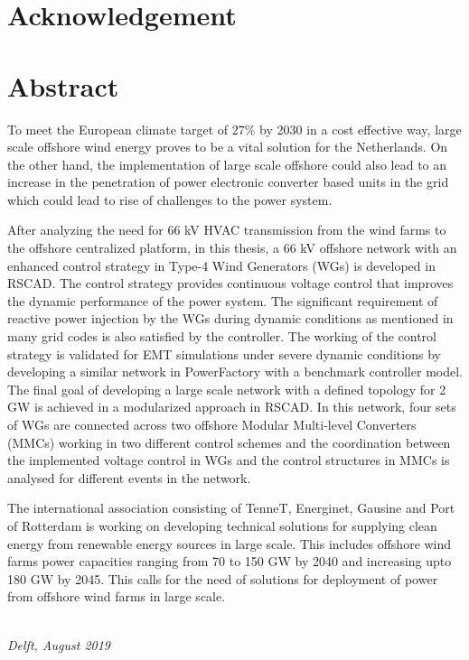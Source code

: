 
\chapter*{Acknowledgement}



\newpage
\chapter*{Abstract}
To meet the European climate target of 27\% by 2030 in a cost effective way, large scale offshore wind energy proves to be a vital solution for the Netherlands. On the other hand, the implementation of large scale offshore could also lead to an increase in the penetration of power electronic converter based units in the grid which could lead to rise of challenges to the power system.

After analyzing the need for 66 kV \gls{HVAC} transmission from the wind farms to the offshore centralized platform, in this thesis, a 66 kV offshore network with an enhanced control strategy in Type-4 Wind Generators (\gls{WG}s) is developed in RSCAD. The control strategy provides continuous voltage control that improves the dynamic performance of the power system. The significant requirement of reactive power injection by the \gls{WG}s during dynamic conditions as mentioned in many grid codes is also satisfied by the controller. The working of the control strategy is validated for \gls{EMT} simulations under severe dynamic conditions by developing a similar network in PowerFactory with a benchmark controller model. The final goal of developing a large scale network with a defined topology for 2 GW is achieved in a modularized approach in RSCAD. In this network, four sets of \gls{WG}s are connected across two offshore Modular Multi-level Converters (\gls{MMC}s) working in two different control schemes and the coordination between the implemented voltage control in \gls{WG}s and the control structures in \gls{MMC}s is analysed for different events in the network.

The international association consisting of TenneT, Energinet, Gausine and Port of Rotterdam is working on developing technical solutions for supplying clean energy from renewable energy sources in large scale. This includes offshore wind farms power capacities ranging from 70 to 150 GW by 2040 and increasing upto 180 GW by 2045. This calls for the need of solutions for deployment of power from offshore wind farms in large scale.

\begin{flushright}
{\makeatletter\itshape
    \@author \\
    Delft, August 2019
\makeatother}
\end{flushright}



